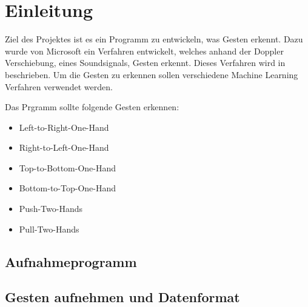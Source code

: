 \section{Einleitung}
Ziel des Projektes ist es ein Programm zu entwickeln, was Gesten erkennt. Dazu wurde von Microsoft ein Verfahren entwickelt, welches anhand der Doppler Verschiebung, eines Soundsignals, Gesten erkennt. Dieses Verfahren wird in \cite{Gupta2012} beschrieben. Um die Gesten zu erkennen sollen verschiedene Machine Learning Verfahren verwendet werden.

Das Prgramm sollte folgende Gesten erkennen:
\begin{itemize}
	\item Left-to-Right-One-Hand
	\item Right-to-Left-One-Hand
	\item Top-to-Bottom-One-Hand
	\item Bottom-to-Top-One-Hand
	\item Push-Two-Hands
	\item Pull-Two-Hands
\end{itemize}

\subsection{Aufnahmeprogramm}

\subsection{Gesten aufnehmen und Datenformat}
\label{sec:gestures_dataformat}

\nocite{Gupta2012}